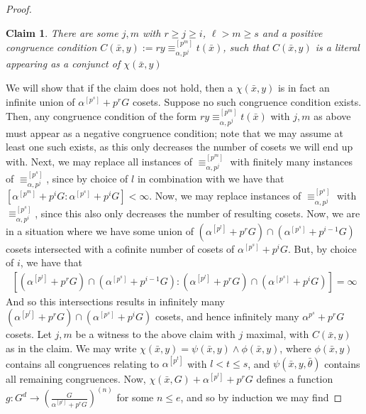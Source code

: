 \documentclass[a4paper,11pt]{article}
\newtheorem*{claim}{Claim}
\newenvironment{claimproof}{\renewcommand{\qedsymbol}{$\blacksquare$}\proof} {\endproof} %
\newcommand{\cs}{\textopencorner}
\newcommand{\ce}{\textcorner}
\newcommand{\acl}{\textrm{acl}}
\newcommand{\nl}{\newline}
\begin{document}
\begin{proof}
	
	\begin{claim}
		There are some $j,m$ with $r \geq j \geq i$, $\ell > m \geq s$ and a positive congruence condition $C(\bar x,y):=$\cs$ ry\equiv_{\alpha,{p^j}}^{[p^m]} t(\bar x)$\ce , such that $C(\bar x, y)$ is a literal appearing as a conjunct of $\chi(\bar x, y)$
	\end{claim}
	\begin{claimproof}
		We will show that if the claim does not hold, then a $\chi(\bar x, y)$ is in fact an infinite union of $\alpha^{[p^s]}+p^rG$ cosets.
		\nl\nl
		Suppose no such congruence condition exists. Then, any congruence condition of the form $ry\equiv_{\alpha,{p^j}}^{[p^m]} t(\bar x)$ with $j,m$ as above must appear as a negative congruence condition; note that we may assume at least one such exists, as this only decreases the number of cosets we will end up with. Next, we may replace all instances of $\equiv_{\alpha, p^j}^{[p^m]}$ with finitely many instances of $\equiv_{\alpha, p^j}^{[p^s]}$, since by choice of $l$ in combination with  we have that $[\alpha^{[p^m]}+p^iG:\alpha^{[p^s]}+p^iG] <\infty$. Now, we may replace instances of $\equiv_{\alpha, p^j}^{[p^s]}$ with $\equiv_{\alpha, p^i}^{[p^s]}$, since this also only decreases the number of resulting cosets.
		\nl\nl
		Now, we are in a situation where we have some union of $(\alpha^{[p^l]}+p^rG)\cap(\alpha^{[p^s]}+p^{i-1}G)$ cosets intersected with a cofinite number of cosets of $\alpha^{[p^s]}+p^iG$. But, by choice of $i$, we have that 
        \begin{align*}
		    \left[(\alpha^{[p^l]}+p^rG)\cap(\alpha^{[p^s]}+p^{i-1}G):(\alpha^{[p^l]}+p^rG)\cap(\alpha^{[p^s]}+p^iG)\right]=\infty
		\end{align*}
		And so this intersections results in infinitely many $(\alpha^{[p^l]}+p^rG)\cap(\alpha^{[p^s]}+p^iG)$ cosets, and hence infinitely many $\alpha^{p^s}+p^rG$ cosets.
	\end{claimproof}
	\noindent Let $j,m$ be a witness to the above claim with $j$ maximal, with $C(\bar x, y)$ as in the claim. We may write $\chi(\bar x, y)=\psi(\bar x, y)\wedge \phi(\bar x, y)$, where $\phi(\bar x, y)$ contains all congruences relating to $\alpha^{[p^t]}$ with $l< t\leq s$, and $\psi(\bar x, y, \bar\theta)$ contains all remaining congruences. Now, $\chi(\bar x, G) + \alpha^{[p^l]}+p^rG$ defines a function $g:G^d\rightarrow (\frac{G}{\alpha^{[p^l]}+p^rG})^{(n)}$ for some $n\leq e$, and so by induction we may find

\end{proof}
\end{document}
